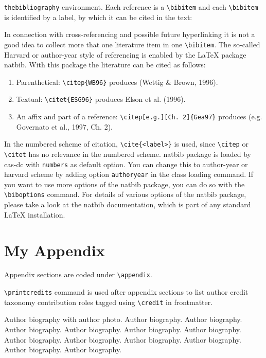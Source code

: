 \documentclass[a4paper,fleqn]{cas-dc}
\begin{document}
\verb+thebibliography+ environment.  Each reference is a\linebreak
\verb+\bibitem+ and each \verb+\bibitem+ is identified by a label,
by which it can be cited in the text:

\noindent In connection with cross-referencing and
possible future hyperlinking it is not a good idea to collect
more that one literature item in one \verb+\bibitem+.  The
so-called Harvard or author-year style of referencing is enabled
by the \LaTeX{} package {natbib}. With this package the
literature can be cited as follows:

\begin{enumerate}[\textbullet]
\item Parenthetical: \verb+\citep{WB96}+ produces (Wettig \& Brown, 1996).
\item Textual: \verb+\citet{ESG96}+ produces Elson et al. (1996).
\item An affix and part of a reference:\break
\verb+\citep[e.g.][Ch. 2]{Gea97}+ produces (e.g. Governato et
al., 1997, Ch. 2).
\end{enumerate}

In the numbered scheme of citation, \verb+\cite{<label>}+ is used,
since \verb+\citep+ or \verb+\citet+ has no relevance in the numbered
scheme.  {natbib} package is loaded by {cas-dc} with
\verb+numbers+ as default option.  You can change this to author-year
or harvard scheme by adding option \verb+authoryear+ in the class
loading command.  If you want to use more options of the {natbib}
package, you can do so with the \verb+\biboptions+ command.  For
details of various options of the {natbib} package, please take a
look at the {natbib} documentation, which is part of any standard
\LaTeX{} installation.

\appendix
\section{My Appendix}
Appendix sections are coded under \verb+\appendix+.

\verb+\printcredits+ command is used after appendix sections to list 
author credit taxonomy contribution roles tagged using \verb+\credit+ 
in frontmatter.

\printcredits

%







Author biography with author photo.
Author biography. Author biography. Author biography.
Author biography. Author biography. Author biography.
Author biography. Author biography. Author biography.
Author biography. Author biography. Author biography.
\endbio
\end{document}
